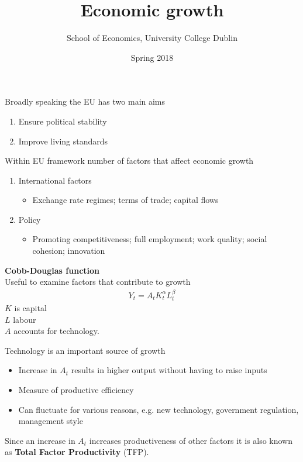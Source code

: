 \documentclass{beamer}
\title{Economic growth}
\author{School of Economics, University College Dublin}
\date{Spring 2018}
\begin{document}
\begin{frame}
 \titlepage
\end{frame}

\begin{frame}
  Broadly speaking the EU has two main aims
  \begin{enumerate}
    \item Ensure political stability
    \item Improve living standards
  \end{enumerate}
\end{frame}

\begin{frame}
  Within EU framework number of factors that affect economic growth
  \begin{enumerate}
    \item International factors
    \begin{itemize}
      \item Exchange rate regimes; terms of trade; capital flows
    \end{itemize}
    \item Policy
    \begin{itemize}
      \item Promoting competitiveness; full employment; work quality; social cohesion; innovation
    \end{itemize}
  \end{enumerate}
\end{frame}

\begin{frame}
 \textbf{Cobb-Douglas function}\\
 Useful to examine factors that contribute to growth
\begin{align}
  Y_t=A_tK^{\alpha}_tL^{\beta}_t
\end{align}
$K$ is capital\\
$L$ labour\\
$A$ accounts for technology. 
\end{frame}

\begin{frame}
 Technology is an important source of growth
\begin{itemize}
  \item Increase in $A_t$ results in higher output without having to raise inputs
  \item Measure of productive efficiency
  \item Can fluctuate for various reasons, e.g. new technology, government regulation, management style
\end{itemize}
  Since an increase in $A_t$ increases productiveness of other factors it is also known as \textbf{Total Factor Productivity} (TFP).
\end{frame}
\end{document}
